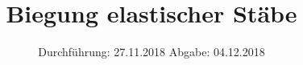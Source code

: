 

\subject{Nr. 103}
\title{Biegung elastischer Stäbe}
\date{%
  Durchführung: 27.11.2018
  \hspace{3em}
  Abgabe: 04.12.2018
}



\maketitle
\thispagestyle{empty}
\tableofcontents
\newpage






\printbibliography{}



